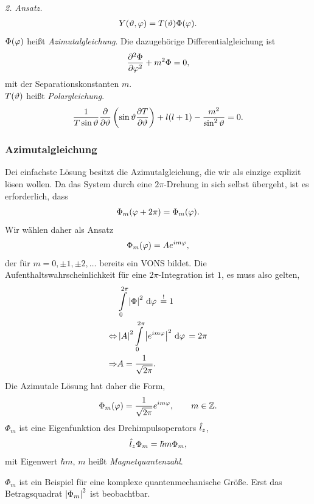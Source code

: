 \textit{2. Ansatz.}
\begin{align*}
Y(\vartheta,\varphi) = T(\vartheta)\Phi(\varphi).
\end{align*}
$\Phi(\varphi)$ heißt \emph{Azimutalgleichung}. Die dazugehörige
Differentialgleichung ist
\begin{align*}
\frac{\partial^2\Phi}{\partial\varphi^2} + m^2\Phi = 0,
\end{align*}
mit der Separationskonstanten $m$.\\
$T(\vartheta)$ heißt \emph{Polargleichung}.
\begin{align*}
\frac{1}{T\sin\vartheta}\frac{\partial}{\partial\vartheta}\left(\sin\vartheta
\frac{\partial T}{\partial\vartheta}\right) + l(l+1) - \frac{m^2}{\sin^2\vartheta} = 0.
\end{align*}

\subsubsection{Azimutalgleichung}
\label{subsubsec:Azimutalgleichung}

Dei einfachste Lösung besitzt die Azimutalgleichung, die wir als einzige
explizit lösen wollen. Da das System durch eine $2\pi$-Drehung in sich selbst übergeht,
ist es erforderlich, dass
\begin{align*}
\Phi_m(\varphi+2\pi) = \Phi_m(\varphi).
\end{align*}
Wir wählen daher als Ansatz
\begin{align*}
\Phi_m(\varphi) = Ae^{im\varphi},
\end{align*}
der für $m=0,\pm 1,\pm 2,\ldots$ bereits ein VONS bildet. Die
Aufenthaltswahrscheinlichkeit für eine $2\pi$-Integration ist $1$, es muss
also gelten,
\begin{align*}
&\int\limits_0^{2\pi} \left|\Phi\right|^2\,\mathrm{d} \varphi\, \overset{!}{=} 1\\
\Leftrightarrow & \left|A\right|^2\int\limits_0^{2\pi}\left|e^{im\varphi}\right|^2\,\mathrm{d} \varphi\, = 2\pi\\
\Rightarrow & A=\frac{1}{\sqrt{2\pi}}.
\end{align*}
Die Azimutale Lösung hat daher die Form,
\begin{align*}
\Phi_m(\varphi) = \frac{1}{\sqrt{2\pi}}e^{im\varphi},\qquad m\in\mathbb{Z}.
\end{align*}
$\Phi_m$ ist eine Eigenfunktion des Drehimpulsoperators $\hat{\boldmath{l}}_z$,
\begin{align*}
\hat{\boldmath{l}}_z\Phi_m = \hbar m\Phi_m,
\end{align*}
mit Eigenwert $\hbar m$, $m$ heißt \emph{Magnetquantenzahl}.

$\Phi_m$ ist ein Beispiel für eine komplexe quantenmechanische Größe.
Erst das Betragsquadrat $\left|\Phi_m\right|^2$ ist beobachtbar.

